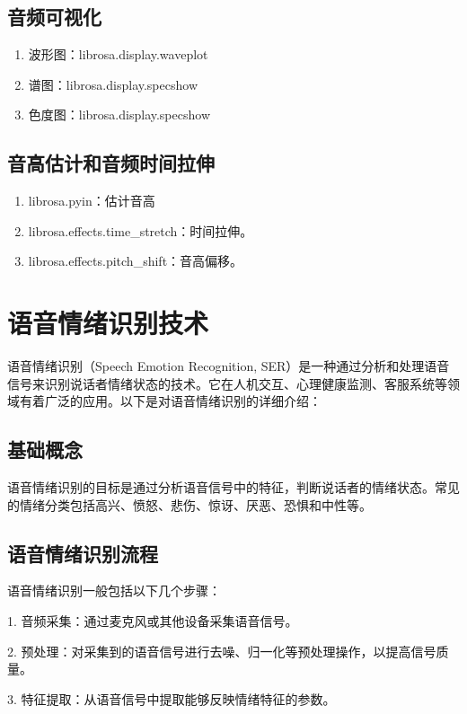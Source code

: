 \documentclass[lang=cn,newtx,12pt,scheme=chinese]{elegantbook}
\begin{document}
\subsection{音频可视化}

\begin{enumerate}
  \item 波形图：librosa.display.waveplot
  \item 谱图：librosa.display.specshow
  \item 色度图：librosa.display.specshow
\end{enumerate}

\subsection{音高估计和音频时间拉伸}

\begin{enumerate}
  \item librosa.pyin：估计音高
  \item librosa.effects.time\_stretch：时间拉伸。
  \item librosa.effects.pitch\_shift：音高偏移。
\end{enumerate}

\section{语音情绪识别技术}

语音情绪识别（Speech Emotion Recognition, SER）是一种通过分析和处理语音信号来识别说话者情绪状态的技术。它在人机交互、心理健康监测、客服系统等领域有着广泛的应用。以下是对语音情绪识别的详细介绍：
\subsection{基础概念}

语音情绪识别的目标是通过分析语音信号中的特征，判断说话者的情绪状态。常见的情绪分类包括高兴、愤怒、悲伤、惊讶、厌恶、恐惧和中性等。

\subsection{语音情绪识别流程}

语音情绪识别一般包括以下几个步骤：

1.	音频采集：通过麦克风或其他设备采集语音信号。

2.	预处理：对采集到的语音信号进行去噪、归一化等预处理操作，以提高信号质量。

	3.	特征提取：从语音信号中提取能够反映情绪特征的参数。
	
\end{document}
